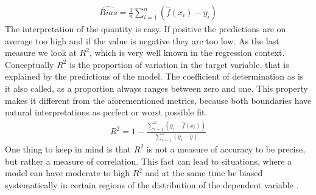 \begin{align}
\hat{Bias}=\frac{1}{n}\sum_{i=1}^n(\hat{f}(x_i)-y_i)
\end{align}
The interpretation of the quantity is easy. If positive the predictions are on average too high and if the value is negative they are too low. As the last measure we look at $R^2$, which is very well known in the regression context. Conceptually $R^2$ is the proportion of variation in the target variable, that is explained by the predictions of the model. The coefficient of determination as is it also called, as a proportion always ranges between zero and one. This property makes it different from the aforementioned metrics, because both boundaries have natural interpretations as perfect or worst possible fit.
\begin{align}
R^2=1-\frac{\sum_{i=1}^n(y_i-\hat{f}(x_i))}{\sum_{i=1}^n(y_i-\bar{y})}
\end{align}
One thing to keep in mind is that $R^2$ is not a measure of accuracy to be precise, but rather a measure of correlation. This fact can lead to situations, where a model can have moderate to high $R^2$ and at the same time be biased systematically in certain regions of the distribution of the dependent variable \citep[see][pp. 95-96]{kuhn2013applied}.   